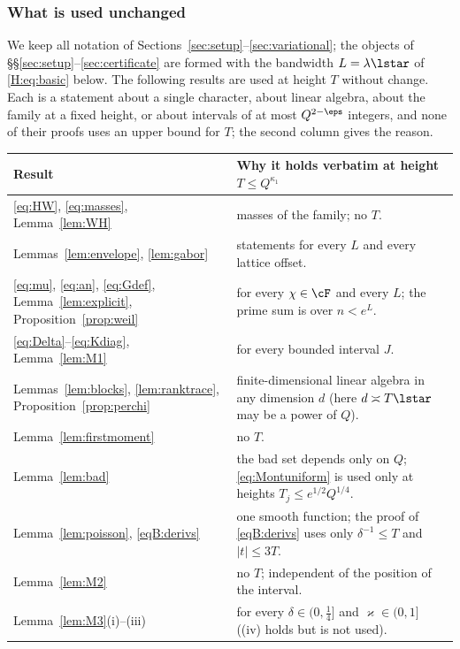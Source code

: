 \subsubsection*{What is used unchanged}\label{H:sec:unchanged}
We keep all notation of Sections~\ref{sec:setup}--\ref{sec:variational}; the objects of \S\S\ref{sec:setup}--\ref{sec:certificate} are formed with the bandwidth $L=\lambda\lstar$ of \eqref{H:eq:basic} below. The following results are used at height $T$ without change. Each is a statement about a single character, about linear algebra, about the family at a fixed height, or about intervals of at most $Q^{2-\eps}$ integers, and none of their proofs uses an upper bound for $T$; the second column gives the reason.
\begin{center}\small
\begin{tabular}{@{}>{\raggedright\arraybackslash}p{5.4cm}>{\raggedright\arraybackslash}p{9.4cm}@{}}
\toprule
Result & Why it holds verbatim at height $T\le Q^{\kappa_1}$\\
\midrule
\eqref{eq:HW}, \eqref{eq:masses}, Lemma~\ref{lem:WH} & masses of the family; no $T$.\\
Lemmas~\ref{lem:envelope}, \ref{lem:gabor} & statements for every $L$ and every lattice offset.\\
\eqref{eq:mu}, \eqref{eq:an}, \eqref{eq:Gdef}, Lemma~\ref{lem:explicit}, Proposition~\ref{prop:weil} & for every $\chi\in\cF$ and every $L$; the prime sum is over $n<e^L$.\\
\eqref{eq:Delta}--\eqref{eq:Kdiag}, Lemma~\ref{lem:M1} & for every bounded interval $J$.\\
Lemmas~\ref{lem:blocks}, \ref{lem:ranktrace}, Proposition~\ref{prop:perchi} & finite-dimensional linear algebra in any dimension $d$ (here $d\asymp T\lstar$ may be a power of $Q$).\\
Lemma~\ref{lem:firstmoment} & no $T$.\\
Lemma~\ref{lem:bad} & the bad set depends only on $Q$; \eqref{eq:Montuniform} is used only at heights $T_j\le e^{1/2}Q^{1/4}$.\\
Lemma~\ref{lem:poisson}, \eqref{eqB:derivs} & one smooth function; the proof of \eqref{eqB:derivs} uses only $\delta^{-1}\le T$ and $|t|\le3T$.\\
Lemma~\ref{lem:M2} & no $T$; independent of the position of the interval.\\
Lemma~\ref{lem:M3}(i)--(iii) & for every $\delta\in(0,\frac14]$ and $\varkappa\in(0,1]$ ((iv) holds but is not used).\\

\end{tabular}
\end{center}
